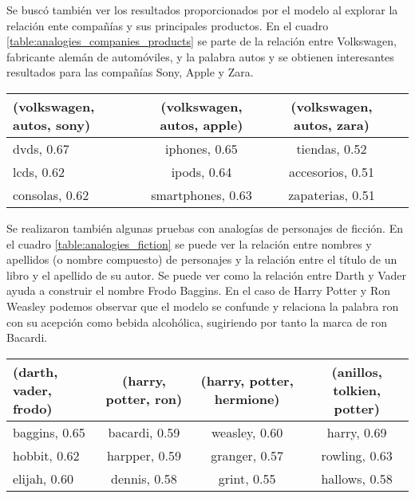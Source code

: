 Se buscó también ver los resultados proporcionados por el modelo al explorar la relación
ente compañías y sus principales productos. En el cuadro
\ref{table:analogies_companies_products} se parte de la relación entre Volkswagen, fabricante
alemán de automóviles, y la palabra autos y se obtienen interesantes resultados para las
compañías Sony, Apple y Zara.

\begin{table*}[ht]
    \centering
    \begin{tabular}{lccc}
        \hline
        (volkswagen, autos, sony) & (volkswagen, autos, apple) & (volkswagen, autos, zara)\\
        \hline
        dvds, 0.67 & iphones, 0.65 & tiendas, 0.52\\
        lcds, 0.62 & ipods, 0.64 & accesorios, 0.51\\
        consolas, 0.62 & smartphones, 0.63 & zapaterias, 0.51\\
        \hline
    \end{tabular}
    \caption{Analogías relacionadas a marcas y sus productos.}
    \label{table:analogies_companies_products}
\end{table*}

Se realizaron también algunas pruebas con analogías de personajes de ficción. En el cuadro
\ref{table:analogies_fiction} se puede ver la relación entre nombres y apellidos
(o nombre compuesto) de personajes y la relación entre el título de un libro y el apellido de su
autor. Se puede ver como la relación entre Darth y Vader ayuda a construir el nombre Frodo
Baggins. En el caso de Harry Potter y Ron Weasley podemos observar que el modelo se
confunde y relaciona la palabra ron con su acepción como bebida alcohólica, sugiriendo por
tanto la marca de ron Bacardi.

\begin{table*}[ht]
    \centering
    \begin{tabular}{lccc}
        \hline
        (darth, vader, frodo) & (harry, potter, ron) & (harry, potter, hermione) & (anillos, tolkien, potter)\\
        \hline
        baggins, 0.65 & bacardi, 0.59 & weasley, 0.60 & harry, 0.69\\
        hobbit, 0.62 & harpper, 0.59 & granger, 0.57 & rowling, 0.63\\
        elijah, 0.60 & dennis, 0.58 & grint, 0.55 & hallows, 0.58\\
        \hline
    \end{tabular}
    \caption{Analogías relacionadas a personajes y autores de ficción.}
    \label{table:analogies_fiction}
\end{table*}

